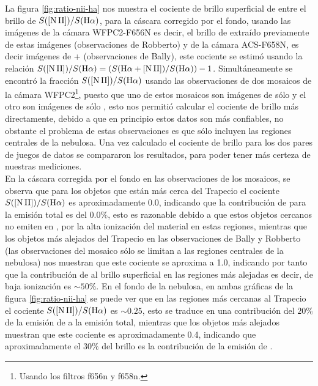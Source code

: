 La figura \ref{fig:ratio-nii-ha} nos muestra el cociente de brillo superficial de \nii{} entre el brillo de \ha{} \(S(\mathrm{[N\,II]}{})/S(\mathrm{H}\alpha{})\), para la cáscara corregido por el fondo, usando las imágenes de la cámara WFPC2-F656N es decir, el brillo de \ha{} extraído previamente de estas imágenes (observaciones de Robberto) y de la cámara ACS-F658N, es decir imágenes de \ha{}+\nii{} (observaciones de Bally), este cociente se estimó usando la relación \(S(\mathrm{[N\,II]}{})/S(\mathrm{H}\alpha{}) = (S(\mathrm{H}\alpha{}+\mathrm{[N\,II]}{})/S(\mathrm{H}\alpha{}))-1\). Simultáneamente se encontró la fracción \(S(\mathrm{[N\,II]}{})/S(\mathrm{H}\alpha{})\) usando las observaciones de dos mosaicos de la cámara WFPC2\footnote{Usando los filtros f656n y f658n.}, puesto que uno de estos mosaicos son imágenes de sólo \ha{} y el otro son imágenes de sólo \nii{}, esto nos permitió  calcular el cociente de brillo más directamente, debido a que en principio estos datos son más confiables, no obstante el problema de estas observaciones es que sólo incluyen las regiones centrales de la nebulosa. Una vez calculado el cociente de brillo para los dos pares de juegos de datos se compararon los resultados, para poder tener más certeza de nuestras mediciones.\\

En la cáscara corregida por el fondo en las observaciones de los mosaicos, se observa que para los objetos que están más cerca del Trapecio el cociente \(S(\mathrm{[N\,II]}{})/S(\mathrm{H}\alpha{})\) es aproximadamente 0.0, indicando que la contribución de \nii{} para la emisión total es del \(0.0\%\), esto es razonable debido a que estos objetos cercanos no emiten en \nii{}, por la alta ionización del material en estas regiones, mientras que los objetos más alejados del Trapecio en las observaciones de Bally y Robberto (las observaciones del mosaico sólo se limitan a las regiones centrales de la nebulosa) nos muestran que este cociente se aproxima a 1.0, indicando por tanto que la contribución de \nii{} al brillo superficial en las regiones más alejadas es decir, de baja ionización es \(\sim 50\%\). En el fondo de la nebulosa, en ambas gráficas de la figura \ref{fig:ratio-nii-ha} se puede ver que en las regiones más cercanas al Trapecio  el cociente \(S(\mathrm{[N\,II]}{})/S(\mathrm{H}\alpha{})\) es \(\sim 0.25\), esto se traduce en una contribución del \(20\%\) de la emisión de \nii{} a la emisión total, mientras que los objetos más alejados muestran que este cociente es aproximadamente 0.4, indicando que aproximadamente el 30\(\%\) del brillo  es la contribución de la emisión de \nii{}.     \\

